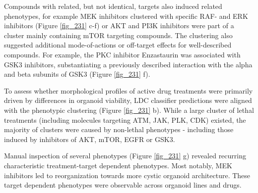 \begin{flushleft}
Compounds with related, but not identical, targets also induced related phenotypes, for example MEK inhibitors clustered with specific RAF- and ERK inhibitors (Figure \ref{fig_231} c-f) or AKT and PI3K inhibitors were part of a cluster mainly containing mTOR targeting compounds. The clustering also suggested additional mode-of-actions or off-target effects for well-described compounds. For example, the PKC inhibitor Enzastaurin was associated with GSK3 inhibitors, substantiating a previously described interaction with the alpha and beta subunits of GSK3 \citep{Kotliarova2008-tz, Klaeger2017-vu} (Figure \ref{fig_231} f). 

\bigbreak
To assess whether morphological profiles of active drug treatments were primarily driven by differences in organoid viability, LDC classifier predictions were aligned with the phenotypic clustering (Figure \ref{fig_231} b). While a large cluster of lethal treatments (including molecules targeting ATM, JAK, PLK, CDK) existed, the majority of clusters were caused by non-lethal phenotypes - including those induced by inhibitors of AKT, mTOR, EGFR or GSK3.

\bigbreak

Manual inspection of several phenotypes (Figure \ref{fig_231} g) revealed recurring characteristic treatment-target dependent phenotypes. Most notably, MEK inhibitors led to reorganization towards more cystic organoid architecture. These target dependent phenotypes were observable across organoid lines and drugs.



\end{flushleft}
